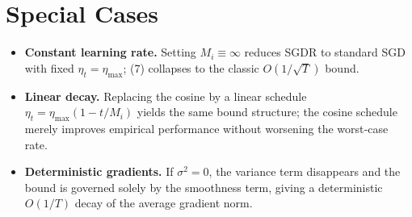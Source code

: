 \documentclass{article}
\begin{document}
\section*{Special Cases}
\begin{itemize}
\item \textbf{Constant learning rate.} Setting $M_i\equiv\infty$ reduces SGDR to standard SGD with fixed $\eta_t=\eta_{\max}$; (7) collapses to the classic $O(1/\sqrt{T})$ bound.
\item \textbf{Linear decay.} Replacing the cosine by a linear schedule $\eta_t=\eta_{\max}(1-t/M_i)$ yields the same bound structure; the cosine schedule merely improves empirical performance without worsening the worst‑case rate.
\item \textbf{Deterministic gradients.} If $\sigma^2=0$, the variance term disappears and the bound is governed solely by the smoothness term, giving a deterministic $O(1/T)$ decay of the average gradient norm.
\end{itemize}
\end{document}
